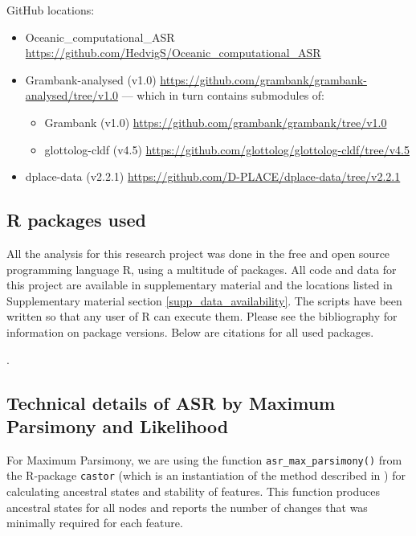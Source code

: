 \documentclass[12pt,letterpaper]{article}
\begin{document}
GitHub locations:
\begin{itemize}
\item Oceanic\_computational\_ASR \url{https://github.com/HedvigS/Oceanic_computational_ASR}
\item Grambank-analysed (v1.0) \url{https://github.com/grambank/grambank-analysed/tree/v1.0} --- which in turn contains submodules of:
\begin{itemize}
\item Grambank (v1.0) \url{https://github.com/grambank/grambank/tree/v1.0}
\item glottolog-cldf (v4.5) \url{https://github.com/glottolog/glottolog-cldf/tree/v4.5}
\end{itemize}
\item dplace-data (v2.2.1) \url{https://github.com/D-PLACE/dplace-data/tree/v2.2.1}
\end{itemize}

\subsection{R packages used}
\label{supp:r_packages}
All the analysis for this research project was done in the free and open source programming language R, using a multitude of packages. All code and data for this project are available in supplementary material and the locations listed in Supplementary material section \ref{supp_data_availability}. The scripts have been written so that any user of R can execute them. Please see the bibliography for information on package versions. Below are citations for all used packages.

.

\FloatBarrier
\subsection{Technical details of ASR by Maximum Parsimony and Likelihood}
\label{supp:tech_details}

For Maximum Parsimony, we are using the function \texttt{asr\_max\_parsimony()} from the R-package \texttt{castor} \citep{louca2017efficient} (which is an instantiation of the method described in \citet{sankoff1975minimal}) for calculating ancestral states and stability of features. This function produces ancestral states for all nodes and reports the number of changes that was minimally required for each feature. 
\end{document}
